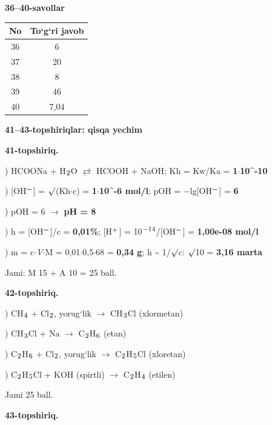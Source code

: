 \documentclass[11pt,a4paper]{article}
\renewcommand{\textsubscript}[1]{\ensuremath{_{\text{\fontsize{8}{8}\selectfont #1}}}}
\renewcommand{\textsuperscript}[1]{\ensuremath{^{\text{\fontsize{8}{8}\selectfont #1}}}}
\begin{document}
\noindent\textbf{36--40-savollar}\par\smallskip
\noindent\begin{tabular}{|c|c|}\hline \textbf{No} & \textbf{To`g`ri javob}\\\hline
36 & 6\\\hline
37 & 20\\\hline
38 & 8\\\hline
39 & 46\\\hline
40 & 7,04\\\hline
\end{tabular}\par\medskip
\noindent\textbf{41--43-topshiriqlar: qisqa yechim}\par\smallskip
\noindent\textbf{41-topshiriq.}\par
{}) HCOONa + H\textsubscript{2}O $\rightleftarrows$ HCOOH + NaOH; Kh = Kw/Ka = \textbf{1$\cdot$10\textasciicircum{}-10}\par
{}) [OH\textsuperscript{$-$}] = $\surd$(Kh$\cdot$c) = \textbf{1$\cdot$10\textasciicircum{}-6 mol/l}; pOH = $-$lg[OH\textsuperscript{$-$}] = \textbf{6}\par
{}) pOH = 6 $\to$ \textbf{pH = 8}\par
{}) h = [OH\textsuperscript{$-$}]/c = \textbf{0,01\%}; [H\textsuperscript{+}] = 10\textsuperscript{$-$14}/[OH\textsuperscript{$-$}] = \textbf{1,00e-08 mol/l}\par
{}) m = c$\cdot$\textit{V}$\cdot$M = 0,01$\cdot$0,5$\cdot$68 = \textbf{0,34 g}; h \textasciitilde{} 1/$\surd$c: $\surd$10 = \textbf{3,16 marta}\par
\noindent Jami: M 15 + A 10 = 25 ball.\par
\noindent\textbf{42-topshiriq.}\par
{}) CH\textsubscript{4} + Cl\textsubscript{2}, yorug`lik $\to$ CH\textsubscript{3}Cl (xlormetan)\par
{}) CH\textsubscript{3}Cl + Na $\to$ C\textsubscript{2}H\textsubscript{6} (etan)\par
{}) C\textsubscript{2}H\textsubscript{6} + Cl\textsubscript{2}, yorug`lik $\to$ C\textsubscript{2}H\textsubscript{5}Cl (xloretan)\par
{}) C\textsubscript{2}H\textsubscript{5}Cl + KOH (spirtli) $\to$ C\textsubscript{2}H\textsubscript{4} (etilen)\par
\noindent Jami 25 ball.\par
\noindent\textbf{43-topshiriq.}\par
\end{document}
